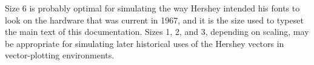 \documentclass{article}
\begin{document}
Size 6 is probably optimal for simulating the way Hershey intended his fonts
to look on the hardware that was current in 1967, and it is the size used to
typeset the main text of this documentation.  Sizes 1, 2, and 3, depending
on scaling, may be appropriate for simulating later historical uses of the
Hershey vectors in vector-plotting environments.
\end{document}
